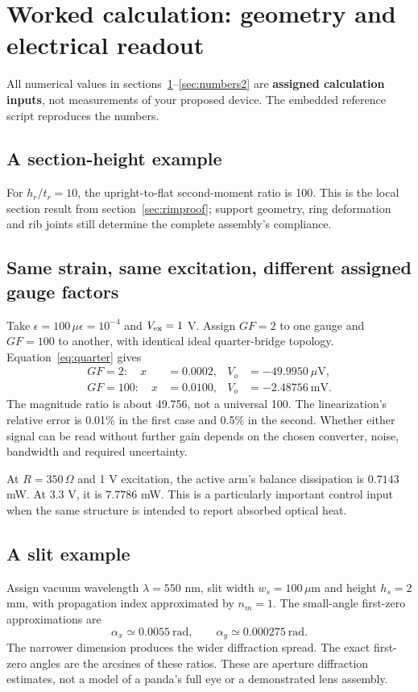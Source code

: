 \documentclass[10pt,a4paper]{article}
\numberwithin{equation}{section}
\newcommand{\newpart}{\clearpage}
\begin{document}
\newpart
\section{Worked calculation: geometry and electrical readout}
\label{sec:numbers1}
All numerical values in sections~\ref{sec:numbers1}--\ref{sec:numbers2} are \textbf{assigned calculation inputs}, not measurements of your proposed device. The embedded reference script reproduces the numbers.

\subsection*{A section-height example}
For $h_r/t_r=10$, the upright-to-flat second-moment ratio is 100. This is the local section result from section~\ref{sec:rimproof}; support geometry, ring deformation and rib joints still determine the complete assembly's compliance.

\subsection*{Same strain, same excitation, different assigned gauge factors}
Take $\epsilon=100\,\mu\epsilon=10^{-4}$ and $V_{\rm ex}=1$ V. Assign $GF=2$ to one gauge and $GF=100$ to another, with identical ideal quarter-bridge topology. Equation~\eqref{eq:quarter} gives
\begin{align}
GF=2:\quad x&=0.0002,&V_o&=-49.9950\ \mu\mathrm V,\\
GF=100:\quad x&=0.0100,&V_o&=-2.48756\ \mathrm{mV}.
\end{align}
The magnitude ratio is about 49.756, not a universal 100. The linearization's relative error is 0.01\% in the first case and 0.5\% in the second. Whether either signal can be read without further gain depends on the chosen converter, noise, bandwidth and required uncertainty.

At $R=350\,\Omega$ and 1 V excitation, the active arm's balance dissipation is $0.7143$ mW. At 3.3 V, it is $7.7786$ mW. This is a particularly important control input when the same structure is intended to report absorbed optical heat.

\subsection*{A slit example}
Assign vacuum wavelength $\lambda=550$ nm, slit width $w_s=100\,\mu$m and height $h_s=2$ mm, with propagation index approximated by $n_m=1$. The small-angle first-zero approximations are
\begin{equation}
\alpha_x\simeq0.0055\ \mathrm{rad},\qquad
\alpha_y\simeq0.000275\ \mathrm{rad}.
\end{equation}
The narrower dimension produces the wider diffraction spread. The exact first-zero angles are the arcsines of these ratios. These are aperture diffraction estimates, not a model of a panda's full eye or a demonstrated lens assembly.
\end{document}
